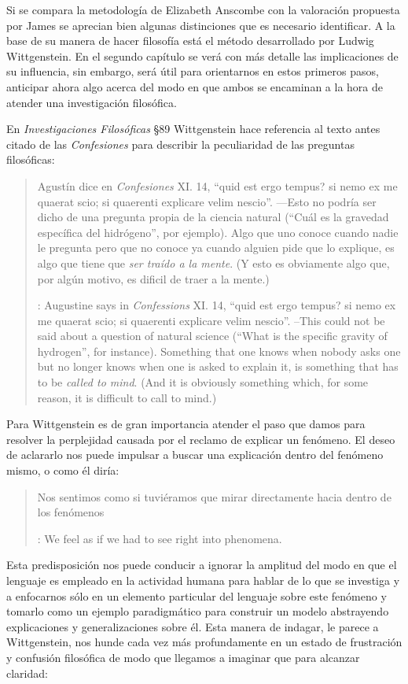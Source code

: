 Si se compara la metodología de Elizabeth Anscombe con la valoración propuesta
por James se aprecian bien algunas distinciones que es necesario identificar. A
la base de su manera de hacer filosofía está el método desarrollado por Ludwig
Wittgenstein. En el segundo capítulo se verá con más detalle las implicaciones
de su influencia, sin embargo, será útil para orientarnos en estos primeros
pasos, anticipar ahora algo acerca del modo en que ambos se encaminan a la hora
de atender una investigación filosófica.

En \emph{Investigaciones Filosóficas} \S89 Wittgenstein hace referencia al texto
antes citado de las \emph{Confesiones} para describir la peculiaridad de las
preguntas filosóficas:

\blockquote[{\cite[\S89]{wittgenstein1953phiinv}}: Augustine says in
\emph{Confessions} XI. 14, \enquote{quid est ergo tempus? si nemo ex me quaerat
  scio; si quaerenti explicare velim nescio}. --This could not be said about a
question of natural science (\enquote{What is the specific gravity of hydrogen},
for instance). Something that one knows when nobody asks one but no longer knows
when one is asked to explain it, is something that has to be \emph{called to
  mind}. (And it is obviously something which, for some reason, it is difficult
to call to mind.)]{Agustín dice en \emph{Confesiones} XI. 14, \enquote{quid est
    ergo tempus? si nemo ex me quaerat scio; si quaerenti explicare velim
    nescio}. ---Esto no podría ser dicho de una pregunta propia de la ciencia
  natural (\enquote{Cuál es la gravedad específica del hidrógeno}, por ejemplo).
  Algo que uno conoce cuando nadie le pregunta pero que no conoce ya cuando
  alguien pide que lo explique, es algo que tiene que \emph{ser traído a la
    mente}. (Y esto es obviamente algo que, por algún motivo, es dificil de
  traer a la mente.)}

Para Wittgenstein es de gran importancia atender el paso que damos para resolver
la perplejidad causada por el reclamo de explicar un fenómeno. El deseo de
aclararlo nos puede impulsar a buscar una explicación dentro del fenómeno mismo,
o como él diría:
\blockquote[{\cite[\S90]{wittgenstein1953phiinv}}: We feel as if we had to see
right into phenomena.]{Nos sentimos como si tuviéramos que mirar directamente
hacia dentro de los fenómenos}.
Esta predisposición nos puede conducir a ignorar la amplitud del modo en que el
lenguaje es empleado en la actividad humana para hablar de lo que se investiga y
a enfocarnos sólo en un elemento particular del lenguaje sobre este fenómeno y
tomarlo como un ejemplo paradigmático para construir un modelo abstrayendo
explicaciones y generalizaciones sobre él. Esta manera de indagar, le parece a
Wittgenstein, nos hunde cada vez más profundamente en un estado de frustración y
confusión filosófica de modo que llegamos a imaginar que para alcanzar claridad:

